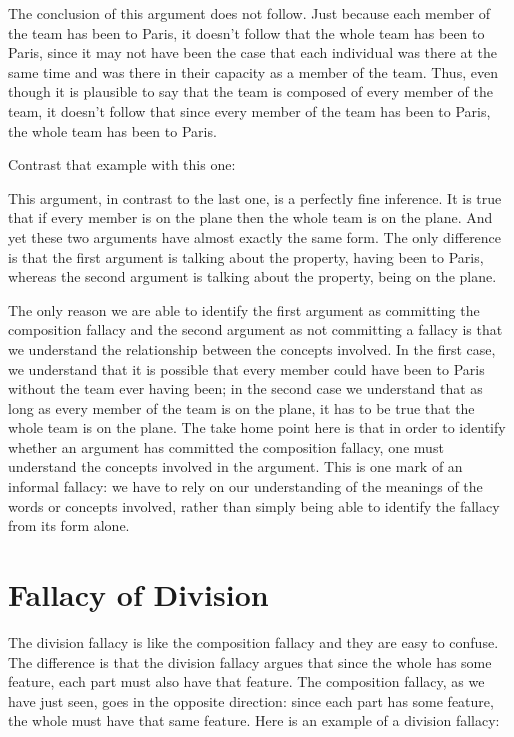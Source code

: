 The conclusion of this argument does not follow. Just because each member of the team has been to Paris, it doesn't follow that the whole team has been to Paris, since it may not have been the case that each individual was there at the same time and was there in their capacity as a member of the team. Thus, even though it is plausible to say that the team is composed of every member of the team, it doesn't follow that since every member of the team has been to Paris, the whole team has been to Paris. 

Contrast that example with this one:

\begin{kormanize}
\end{kormanize}

This argument, in contrast to the last one, is a perfectly fine inference. It is true that if every member is on the plane then the whole team is on the plane. And yet these two arguments have almost exactly the same form. The only difference is that the first argument is talking about the property, having been to Paris, whereas the second argument is talking about the property, being on the plane. 

The only reason we are able to identify the first argument as committing the composition fallacy and the second argument as not committing a fallacy is that we understand the relationship between the concepts involved. In the first case, we understand that it is possible that every member could have been to Paris without the team ever having been; in the second case we understand that as long as every member of the team is on the plane, it has to be true that the whole team is on the plane. The take home point here is that in order to identify whether an argument has committed the composition fallacy, one must understand the concepts involved in the argument. This is one mark of an informal fallacy: we have to rely on our understanding of the meanings of the words or concepts involved, rather than simply being able to identify the fallacy from its form alone.

\section{Fallacy of Division}\label{sec:division}
The division fallacy is like the composition fallacy and they are easy to confuse. The difference is that the division fallacy argues that since the whole has some feature, each part must also have that feature. The composition fallacy, as we have just seen, goes in the opposite direction: since each part has some feature, the whole must have that same feature. Here is an example of a division fallacy:

